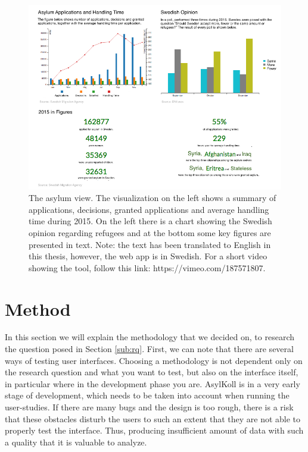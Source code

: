\documentclass{acmtog} %
\begin{document}
\begin{figure}
\centering
\includegraphics[width=\textwidth]{img/view2_en.png}
\caption{The asylum view. The visualization on the left shows a summary of applications, decisions, granted applications and average handling time during 2015. On the left there is a chart showing the Swedish opinion regarding refugees and at the bottom some key figures are presented in text. Note: the text has been translated to English in this thesis, however, the web app is in Swedish. For a short video showing the tool, follow this link: https://vimeo.com/187571807.}
\label{fig:view2}
\end{figure}

\section{Method}
\label{sec:method}
In this section we will explain the methodology that we decided on, to research the question posed in Section \ref{sub:rq}. First, we can note that there are several ways of testing user interfaces. Choosing a methodology is not dependent only on the research question and what you want to test, but also on the interface itself, in particular where in the development phase you are. AsylKoll is in a very early stage of development, which needs to be taken into account when running the user-studies. If there are many bugs and the design is too rough, there is a risk that these obstacles disturb the users to such an extent that they are not able to properly test the interface. Thus, producing insufficient amount of data with such a quality that it is valuable to analyze. 
\end{document}
